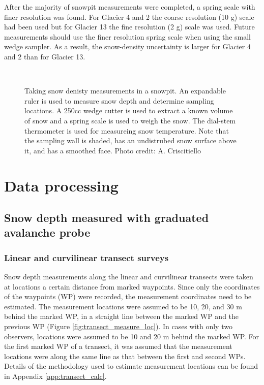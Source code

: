 \documentclass{sfuthesis}
\begin{document}
After the majority of snowpit measurements were completed, a spring scale with finer resolution was found. For Glacier 4 and 2 the coarse resolution (10 g) scale had been used but for Glacier 13 the fine resolution (2 g) scale was used. Future measurements should use the finer resolution spring scale when using the small wedge sampler. As a result, the snow-density uncertainty is larger for Glacier 4 and 2 than for Glacier 13. 

\begin{figure}[H]
	\centering
	\\
	\caption{Taking snow denisty measurements in a snowpit. An expandable ruler is used to measure snow depth and determine sampling locations. A 250cc wedge cutter is used to extract a known volume of snow and a spring scale is used to weigh the snow. The dial-stem thermometer is used for measureing snow temperature. Note that the sampling wall is shaded, has an undistrubed snow surface above it, and has a smoothed face. Photo credit: A. Criscitiello}
	\label{photo_snowpit}
	\end{figure}

\section{Data processing}
\subsection{Snow depth measured with graduated avalanche probe}

\subsubsection{Linear and curvilinear transect surveys}

Snow depth measurements along the linear and curvilinear transects were taken at locations a certain distance from marked waypoints. Since only the coordinates of the waypoints (WP) were recorded, the measurement coordinates need to be estimated. The measurement locations were assumed to be 10, 20, and 30 m behind the marked WP, in a straight line between the marked WP and the previous WP (Figure \ref{fig:transect_measure_loc}). In cases with only two observers, locations were assumed to be 10 and 20 m behind the marked WP. For the first marked WP of a transect, it was assumed that the measurement locations were along the same line as that between the first and second WPs. Details of the methodology used to estimate measurement locations can be found in Appendix \ref{app:transect_calc}.
\end{document}
